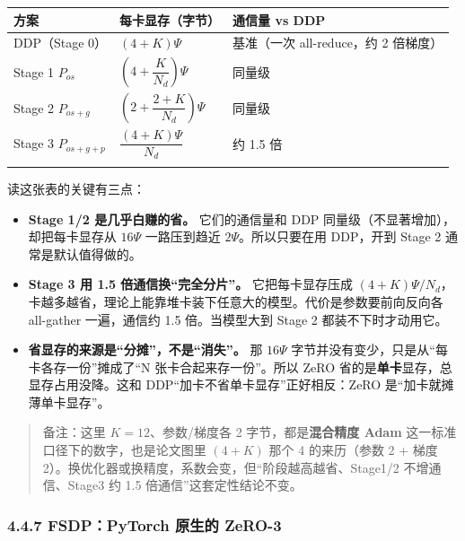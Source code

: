 \documentclass[
  chinese,
]{ctexart}
\providecommand{\tightlist}{%
  \setlength{\itemsep}{0pt}\setlength{\parskip}{0pt}}
\begin{document}
\begin{center}
\begin{tabular}{@{}>{\raggedright\arraybackslash}p{} >{\raggedright\arraybackslash}p{} >{\raggedright\arraybackslash}p{}@{}}
\toprule\noalign{}
方案 & 每卡显存（字节） & 通信量 vs DDP \\
\midrule\noalign{}
DDP（Stage 0） & \((4+K)\Psi\) & 基准（一次 all-reduce，约 2 倍梯度） \\
Stage 1 \(P_{os}\) & \(\left(4+\dfrac{K}{N_d}\right)\Psi\) & 同量级 \\
Stage 2 \(P_{os+g}\) & \(\left(2+\dfrac{2+K}{N_d}\right)\Psi\) & 同量级 \\
Stage 3 \(P_{os+g+p}\) & \(\dfrac{(4+K)\Psi}{N_d}\) & 约 1.5 倍 \\
\bottomrule\noalign{}
\end{tabular}
\end{center}

读这张表的关键有三点：

\begin{itemize}
\tightlist
\item
  \textbf{Stage 1/2 是几乎白赚的省。} 它们的通信量和 DDP
  同量级（不显著增加），却把每卡显存从 \(16\Psi\) 一路压到趋近
  \(2\Psi\)。所以只要在用 DDP，开到 Stage 2 通常是默认值得做的。
\item
  \textbf{Stage 3 用 1.5 倍通信换``完全分片''。} 它把每卡显存压成
  \((4+K)\Psi/N_d\)，卡越多越省，理论上能靠堆卡装下任意大的模型。代价是参数要前向反向各
  all-gather 一遍，通信约 1.5 倍。当模型大到 Stage 2
  都装不下时才动用它。
\item
  \textbf{省显存的来源是``分摊''，不是``消失''。} 那 \(16\Psi\)
  字节并没有变少，只是从``每卡各存一份''摊成了``N
  张卡合起来存一份''。所以 ZeRO
  省的是\textbf{单卡}显存，总显存占用没降。这和
  DDP``加卡不省单卡显存''正好相反：ZeRO 是``加卡就摊薄单卡显存''。
\end{itemize}

\begin{quote}
备注：这里 \(K=12\)、参数/梯度各 2 字节，都是\textbf{混合精度 Adam}
这一标准口径下的数字，也是论文图里 \((4+K)\) 那个 4 的来历（参数 2 +
梯度 2）。换优化器或换精度，系数会变，但``阶段越高越省、Stage1/2
不增通信、Stage3 约 1.5 倍通信''这套定性结论不变。
\end{quote}

\subsubsection{4.4.7 FSDP：PyTorch 原生的
ZeRO-3}\label{fsdppytorch-ux539fux751fux7684-zero-3}
\end{document}

